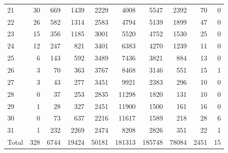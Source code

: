 \begin{table}
\begin{tabular}{lrrrrrrrrr}
21 & 30 & 669 & 1439 & 2229 & 4008 & 5547 & 2392 & 70 & 0 \\
22 & 26 & 582 & 1314 & 2583 & 4794 & 5139 & 1899 & 47 & 0 \\
23 & 15 & 356 & 1185 & 3001 & 5520 & 4752 & 1530 & 25 & 0 \\
24 & 12 & 247 & 821 & 3401 & 6383 & 4270 & 1239 & 11 & 0 \\
25 & 6 & 143 & 592 & 3489 & 7436 & 3821 & 884 & 13 & 0 \\
26 & 3 & 70 & 363 & 3767 & 8468 & 3146 & 551 & 15 & 1 \\
27 & 3 & 43 & 277 & 3451 & 9921 & 2383 & 296 & 10 & 0 \\
28 & 0 & 37 & 253 & 2835 & 11298 & 1820 & 131 & 10 & 0 \\
29 & 1 & 28 & 327 & 2451 & 11900 & 1500 & 161 & 16 & 0 \\
30 & 0 & 73 & 637 & 2216 & 11617 & 1589 & 218 & 28 & 6 \\
31 & 1 & 232 & 2269 & 2474 & 8208 & 2826 & 351 & 22 & 1 \\
Total & 328 & 6744 & 19424 & 50181 & 181313 & 185748 & 78084 & 2451 & 15 \\
\end{tabular}
\end{table}
